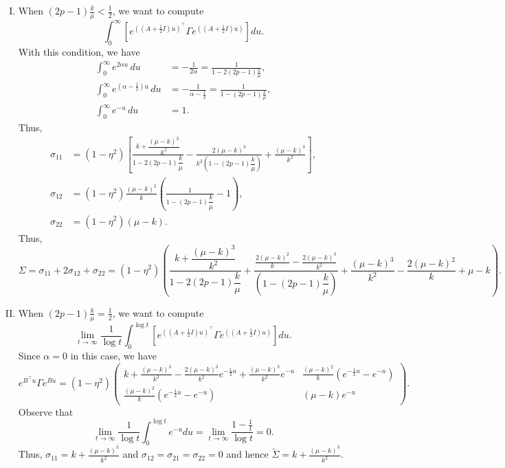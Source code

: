 \documentclass{article}
\numberwithin{equation}{section}
\newcommand{\1}{\mathbf{1}}
\newcommand{\0}{\mathbf{0}}
\begin{document}
\begin{enumerate}[I.]
    \item When $(2p-1)\frac{k}{\mu} < \frac{1}{2}$, we want to compute 
    \[ \int_0^\infty \left[ e^{\left((A+\frac{1}{2} I)u\right)^\top} \Gamma e^{\left((A+\frac{1}{2} I )u \right)} \right] du. \]
With this condition, we have
\begin{align*}
\int_0^\infty e^{2\alpha u}\,du &= -\frac{1}{2\alpha} = \frac{1}{1-2(2p-1)\frac{k}{\mu}},\\
\int_0^\infty e^{(\alpha-\frac12)u}\,du &= -\frac{1}{\alpha-\frac12} = \frac{1}{1-(2p-1)\frac{k}{\mu}},\\
\int_0^\infty e^{-u}\,du &=1.
\end{align*}
Thus, 
\begin{align*}
\sigma_{11} &= (1-\eta^2)\left[
\frac{k+\dfrac{(\mu-k)^3}{k^2}}{1-2(2p-1)\dfrac{k}{\mu}} - \frac{2(\mu-k)^3}{k^2\left(1-(2p-1)\dfrac{k}{\mu}\right)}+\frac{(\mu-k)^3}{k^2}
\right],\\
\sigma_{12} &= (1-\eta^2) \frac{(\mu-k)^2}{k} \left(\frac{1}{1-(2p-1)\dfrac{k}{\mu}} -1\right),\\
\sigma_{22} &= (1-\eta^2)(\mu-k). 
\end{align*}
Thus, 
\[\Sigma = \sigma_{11} + 2\sigma_{12}+\sigma_{22} = (1-\eta^2)\left(\frac{k+ \dfrac{(\mu-k)^3}{k^2}}{1-2(2p-1)\dfrac{k}{\mu}} + \frac{\frac{2(\mu-k)^2}{k}-\frac{2(\mu-k)^3}{k^2}}{\left(1-(2p-1)\dfrac{k}{\mu}\right)}+\frac{(\mu-k)^3}{k^2} - \frac{2(\mu-k)^2}{k} + \mu-k \right).\]
\item When $(2p-1)\frac{k}{\mu} = \frac{1}{2}$, we want to compute 
    \[ \lim_{t \to \infty} \frac{1}{\log t} \int_0^{\log t} \left[ e^{\left((A+\frac{1}{2} I)u\right)^\top} \Gamma e^{\left((A+\frac{1}{2} I )u \right)} \right] du. \]
    Since $\alpha = 0$ in this case, we have
\begin{equation*}
    e^{B^\top u} \Gamma e^{Bu} =
(1-\eta^2)\begin{pmatrix}
 k+\frac{(\mu-k)^3}{k^2} -\frac{2(\mu-k)^3}{k^2} e^{-\frac{1}{2}u} +\frac{(\mu-k)^3}{k^2}e^{-u}
&
\frac{(\mu-k)^2}{k} \left(e^{-\frac{1}{2}u} -e^{-u}
\right) \\
\frac{(\mu-k)^2}{k}
\left(e^{-\frac{1}{2}u}
-e^{-u} \right)
&
(\mu-k)e^{-u}
\end{pmatrix}.
\end{equation*}
Observe that \[\lim_{t\rightarrow\infty} \frac{1}{\log t} \int_0^{\log t}  e^{-u}du = \lim_{t\rightarrow\infty} \frac{1-\frac{1}{t}}{\log t} = 0. \]
Thus, $\sigma_{11} = k+\frac{(\mu-k)^3}{k^2} $ and $\sigma_{12} = \sigma_{21} = \sigma_{22} = 0$ and hence $\widetilde{\Sigma} = k+\frac{(\mu-k)^3}{k^2}$.
\end{enumerate}
\newpage
\end{document}

